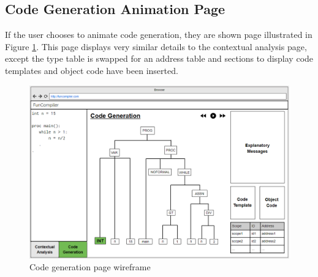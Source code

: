 \documentclass{l4proj}
\begin{document}
\subsection{Code Generation Animation Page}
If the user chooses to animate code generation, they are shown page illustrated in Figure \ref{fig:full3}. This page displays very similar details to the contextual analysis page, except the type table is swapped for an address table and sections to display code templates and object code have been inserted.

 \begin{figure}[h]
\centering
\includegraphics[scale=0.4]{images/full3.png}
\caption{Code generation page wireframe}
\label{fig:full3}	
\end{figure}


\end{document}
